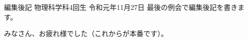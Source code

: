 \documentclass[10pt,b5paper,papersize,dvipdfmx]{jsbook}
\begin{document}
\begin{preface}{編集後記}
        {物理科学科4回生}
        {}
        {令和元年11月27日}
  最後の例会で編集後記を書きます。\par
  みなさん、お疲れ様でした（これからが本番です）。
\end{preface}
\end{document}
